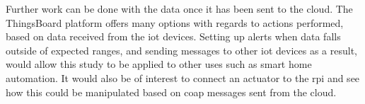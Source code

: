 Further work can be done with the data once it has been sent to the cloud.
The ThingsBoard platform offers many options with regards to actions performed,
based on data received from the \gls{iot} devices. Setting up alerts when data
falls outside of expected ranges, and sending messages to other \gls{iot} 
devices as a result, would allow this study to be applied to other uses such
as smart home automation. It would also be of interest to connect an 
actuator to the \gls{rpi} and see how this could be manipulated based on
\gls{coap} messages sent from the cloud. 